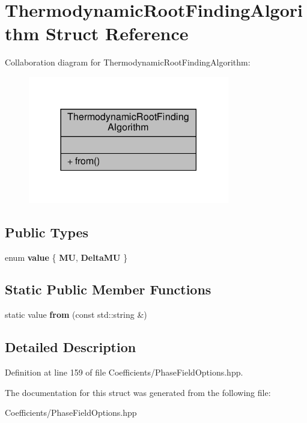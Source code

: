 \hypertarget{structThermodynamicRootFindingAlgorithm}{}\section{Thermodynamic\+Root\+Finding\+Algorithm Struct Reference}
\label{structThermodynamicRootFindingAlgorithm}


Collaboration diagram for Thermodynamic\+Root\+Finding\+Algorithm\+:\nopagebreak
\begin{figure}[H]
\begin{center}
\leavevmode
\includegraphics[width=249pt]{structThermodynamicRootFindingAlgorithm__coll__graph}
\end{center}
\end{figure}
\subsection*{Public Types}
\begin{DoxyCompactItemize}
\item 
\mbox{\label{structThermodynamicRootFindingAlgorithm_a474011d33454b3ccdf6c2ae1be10ce79}} 
enum {\bfseries value} \{ {\bfseries MU}, 
{\bfseries Delta\+MU}
 \}
\end{DoxyCompactItemize}
\subsection*{Static Public Member Functions}
\begin{DoxyCompactItemize}
\item 
\mbox{\label{structThermodynamicRootFindingAlgorithm_a90a72ce65e9c0ff79c4bd5e527f5b2e2}} 
static value {\bfseries from} (const std\+::string \&)
\end{DoxyCompactItemize}


\subsection{Detailed Description}


Definition at line 159 of file Coefficients/\+Phase\+Field\+Options.\+hpp.



The documentation for this struct was generated from the following file\+:\begin{DoxyCompactItemize}
\item 
Coefficients/\+Phase\+Field\+Options.\+hpp\end{DoxyCompactItemize}
